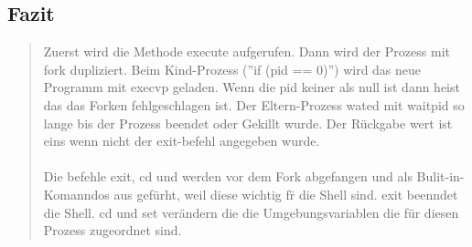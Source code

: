 	\subsection{Fazit}
		\begin{quote}
			Zuerst wird die Methode execute aufgerufen. Dann wird der Prozess mit fork dupliziert. Beim Kind-Prozess (''if (pid == 0)'') wird das neue Programm mit execvp geladen. Wenn die pid keiner als null ist dann heist das das Forken fehlgeschlagen ist. Der Eltern-Prozess wated mit waitpid so lange bis der Prozess beendet oder Gekillt wurde. Der R\"uckgabe wert ist eins wenn nicht der exit-befehl angegeben wurde.\\ \\
			Die befehle exit, cd und werden vor dem Fork abgefangen und als Bulit-in-Komanndos aus gefürht, weil diese wichtig f\"r die Shell sind. exit beenndet die Shell. cd und set ver\"andern die die Umgebungsvariablen die f\"ur diesen Prozess zugeordnet sind.
		\end{quote}